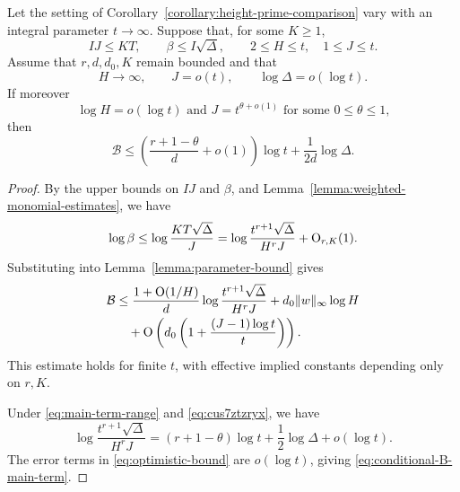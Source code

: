 \documentclass[reqno]{amsart} 
\begin{document}
\begin{proposition}\label{proposition:conditional-main-term}
  Let the setting of Corollary~\ref{corollary:height-prime-comparison} vary with an integral parameter $t\to\infty$.  Suppose that, for some $K\geq1$,
  \begin{equation}\label{eq:optimistic-interpolation}
    IJ\leq KT,\qquad \beta\leq I\sqrt\Delta,
    \qquad 2\leq H\leq t,\quad 1\leq J\leq t.
  \end{equation}
  Assume that $r,d,d_0,K$ remain bounded and that
  \begin{equation}\label{eq:main-term-range}
    H\to\infty,\qquad J=o(t),\qquad \log\Delta=o(\log t).
  \end{equation}
  If moreover
  \begin{equation}\label{eq:cus7ztzryx}
    \text{$\log H=o(\log t)$ and $J=t^{\theta+o(1)}$ for some $0\leq\theta\leq1$,}
  \end{equation}
  then
  \begin{equation}\label{eq:conditional-B-main-term}
    \mathcal{B}\leq\left(\frac{r+1-\theta}{d}+o(1)\right)\log t
    +\frac1{2d}\log\Delta.
  \end{equation}
\end{proposition}
\begin{proof}
  By the upper bounds on $IJ$ and $\beta$, and Lemma~\ref{lemma:weighted-monomial-estimates}, we have
  \begin{equation*}
    \log\beta\leq\log\frac{KT\sqrt\Delta}{J}
    =\log\frac{t^{r+1}\sqrt\Delta}{H^rJ}+\operatorname{O}_{r,K}(1).
  \end{equation*}
  Substituting into Lemma~\ref{lemma:parameter-bound} gives
  \begin{equation}\label{eq:optimistic-bound}
    \begin{split}
      \mathcal{B}
      &\leq\frac{1+\operatorname{O}(1/H)}{d}\log\frac{t^{r+1}\sqrt\Delta}{H^rJ}
      +d_0\lVert w\rVert_\infty\log H \\
      &\quad+\operatorname{O}\left(d_0\left(1+\frac{(J-1)\log t}{t}\right)\right).
    \end{split}
  \end{equation}
  This estimate holds for finite $t$, with effective implied constants depending only on $r,K$.

  Under \eqref{eq:main-term-range} and \eqref{eq:cus7ztzryx}, we have
  \begin{equation*}
    \log\frac{t^{r+1}\sqrt\Delta}{H^rJ}
    =(r+1-\theta)\log t+\frac12\log\Delta+o(\log t).
  \end{equation*}
  The error terms in \eqref{eq:optimistic-bound} are $o(\log t)$, giving \eqref{eq:conditional-B-main-term}.
\end{proof}
\end{document}
